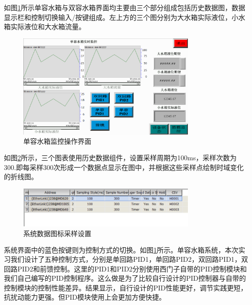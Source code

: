 \documentclass[UTF8]{article}
\begin{document}
如图\ref{fig:img7}所示单容水箱与双容水箱界面均主要由三个部分组成包括历史数据图，数据显示栏和控制切换输入/按键组成。左上方的三个图分别为大水箱实际液位，小水箱实际液位和大水箱流量。
\begin{figure}[H]
    \centering %
    \includegraphics[width=0.8\textwidth]{figure/单容水箱监控操作界面.png} 
    \caption{单容水箱监控操作界面} %
    \label{fig:img7} %
\end{figure}

如图\ref{fig:img8}所示，三个图表使用历史数据组件，设置采样周期为100ms，采样次数为300.即每采样300次形成一个数据点显示在图中，并根据这些采样点绘制时域变化的折线图。
\begin{figure}[H]
    \centering %
    \includegraphics[width=0.8\textwidth]{figure/系统数据图标采样设置.png} 
    \caption{系统数据图标采样设置} %
    \label{fig:img8} %
\end{figure}

系统界面中的蓝色按键则为控制方式的切换。如图\ref{fig:img7}所示。单容水箱系统，本次实习我们设计了五种控制方式，分别是单回路PID1，单回路PID2，双回路PID1，双回路PID2和前馈控制。这里的PID1和PID2分别使用西门子自带的PID控制模块和我们自己编写的PID控制程序。这么做是为了比较自行设计的PID控制器与自带的控制模块的控制性能差异。结果显示，自行设计的PID性能更好，调节实践更短，抗扰动能力更强。但PID模块使用上会更加方便快捷。
\end{document}
